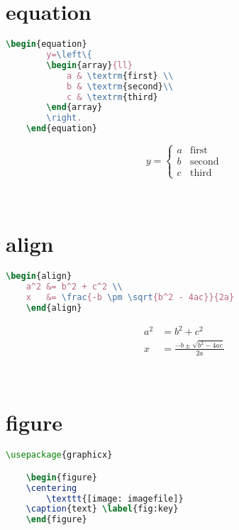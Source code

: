 \documentclass[11pt,a4paper]{article}
\begin{document}
\section{equation}
\begin{minipage}[c]{0.5\textwidth}
\begin{lstlisting}[language = TeX]
	\begin{equation}
		y=\left\{
		\begin{array}{ll}
			a & \textrm{first} \\
			b & \textrm{second}\\
			c & \textrm{third}
		\end{array} 
		\right.
	\end{equation}
\end{lstlisting}
\end{minipage}
\begin{minipage}[c]{0.4\textwidth}
	\begin{equation}
	y=\left\{
	\begin{array}{ll}
	a & \textrm{first} \\
	b & \textrm{second}\\
	c & \textrm{third}
	\end{array} 
	\right.
	\end{equation}		
\end{minipage}
\\[1em]
\section{align}
\begin{minipage}[c]{0.5\textwidth}
\begin{lstlisting}[language = TeX]
	\begin{align}
	a^2 &= b^2 + c^2 \\
	x   &= \frac{-b \pm \sqrt{b^2 - 4ac}}{2a} 
	\end{align}		
\end{lstlisting}
\end{minipage}
\begin{minipage}[c]{0.5\textwidth}
	\begin{align}
	a^2 &= b^2 + c^2 \\
	x &= \frac{-b \pm \sqrt{b^2 - 4ac}}{2a} 
	\end{align}		
\end{minipage}
\\[1em]
\section{figure}
\begin{lstlisting}[language = TeX]
\usepackage{graphicx}

	\begin{figure}
	\centering
		\texttt{[image: imagefile]}
	\caption{text} \label{fig:key}
	\end{figure}
\end{lstlisting}
\end{document}
